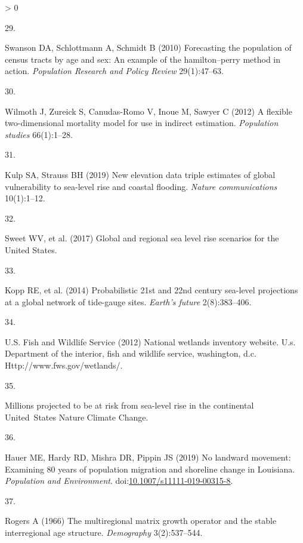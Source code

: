 \documentclass[9pt,twocolumn,twoside,]{pnas-new}
\newlength{\csllabelwidth}
\newlength{\cslhangindent}
\newenvironment{CSLReferences}[3] %
 {%
  \setlength{\parindent}{0pt}
  \ifodd #1 \everypar{\setlength{\hangindent}{\cslhangindent}}\ignorespaces\fi
  \ifnum #2 > 0
  \setlength{\parskip}{#3\baselineskip}
  \fi
 }%
 {}
\newcommand{\CSLLeftMargin}[1]{\parbox[t]{\maxof{\widthof{#1}}{\csllabelwidth}}{#1}}
\newcommand{\CSLRightInline}[1]{\parbox[t]{\linewidth}{#1}}
\begin{document}
\begin{CSLReferences}{0}{0}
\leavevmode\hypertarget{ref-swanson2010forecasting}{}%
\CSLLeftMargin{29. }
\CSLRightInline{Swanson DA, Schlottmann A, Schmidt B (2010) Forecasting
the population of census tracts by age and sex: An example of the
hamilton--perry method in action. \emph{Population Research and Policy
Review} 29(1):47--63.}

\leavevmode\hypertarget{ref-wilmoth2012flexible}{}%
\CSLLeftMargin{30. }
\CSLRightInline{Wilmoth J, Zureick S, Canudas-Romo V, Inoue M, Sawyer C
(2012) A flexible two-dimensional mortality model for use in indirect
estimation. \emph{Population studies} 66(1):1--28.}

\leavevmode\hypertarget{ref-kulp2019new}{}%
\CSLLeftMargin{31. }
\CSLRightInline{Kulp SA, Strauss BH (2019) New elevation data triple
estimates of global vulnerability to sea-level rise and coastal
flooding. \emph{Nature communications} 10(1):1--12.}

\leavevmode\hypertarget{ref-sweetGlobalRegionalSea2017}{}%
\CSLLeftMargin{32. }
\CSLRightInline{Sweet WV, et al. (2017) Global and regional sea level
rise scenarios for the {United States}.}

\leavevmode\hypertarget{ref-koppProbabilistic21st22nd2014}{}%
\CSLLeftMargin{33. }
\CSLRightInline{Kopp RE, et al. (2014) Probabilistic 21st and 22nd
century sea-level projections at a global network of tide-gauge sites.
\emph{Earth's future} 2(8):383--406.}

\leavevmode\hypertarget{ref-WetlandInventory}{}%
\CSLLeftMargin{34. }
\CSLRightInline{U.S. Fish and Wildlife Service (2012) National wetlands
inventory website. U.s. Department of the interior, fish and wildlife
service, washington, d.c. Http://www.fws.gov/wetlands/.}

\leavevmode\hypertarget{ref-MillionsProjectedBe}{}%
\CSLLeftMargin{35. }
\CSLRightInline{Millions projected to be at risk from sea-level rise in
the continental {United~States} \textbar{} {Nature Climate Change}.}

\leavevmode\hypertarget{ref-hauerNoLandwardMovement2019}{}%
\CSLLeftMargin{36. }
\CSLRightInline{Hauer ME, Hardy RD, Mishra DR, Pippin JS (2019) No
landward movement: Examining 80 years of population migration and
shoreline change in {Louisiana}. \emph{Population and Environment}.
doi:\href{https://doi.org/10.1007/s11111-019-00315-8}{10.1007/s11111-019-00315-8}.}

\leavevmode\hypertarget{ref-rogers1966multiregional}{}%
\CSLLeftMargin{37. }
\CSLRightInline{Rogers A (1966) The multiregional matrix growth operator
and the stable interregional age structure. \emph{Demography}
3(2):537--544.}


\end{CSLReferences}
\end{document}
